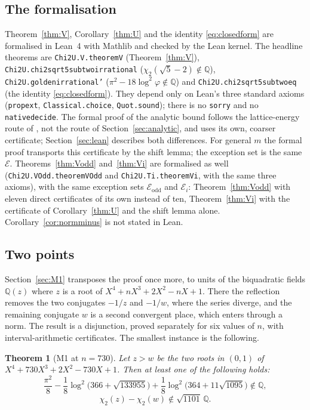 \documentclass[11pt]{amsart}
\newtheorem{theorem}{Theorem}[section]
\theoremstyle{definition}
\theoremstyle{remark}
\numberwithin{equation}{section}
\newcommand{\QQ}{\mathbb{Q}}
\newcommand{\cE}{\mathcal{E}}
\newcommand{\lean}[1]{{\def\_{\textunderscore\allowbreak}\texttt{#1}}}
\begin{document}
\subsection{The formalisation}
Theorem~\ref{thm:V}, Corollary~\ref{thm:U} and the identity \eqref{eq:closedform} are formalised in Lean~4
\cite{LeanFour} with Mathlib \cite{Mathlib} and checked by the Lean kernel. The headline theorems are
\lean{Chi2U.V.theoremV} (Theorem~\ref{thm:V}), \lean{Chi2U.chi2\_sqrt5\_sub\_two\_irrational}
($\chi_2(\sqrt5-2)\notin\QQ$), \lean{Chi2U.golden\_irrational'} ($\pi^2-18\log^2\varphi\notin\QQ$) and
\lean{Chi2U.chi2\_sqrt5\_sub\_two\_eq} (the identity \eqref{eq:closedform}). They depend only on Lean's three standard
axioms (\lean{propext}, \lean{Classical.choice}, \lean{Quot.sound}); there is no \lean{sorry} and no
\lean{native\_decide}. The formal proof of the analytic bound follows the lattice-energy route of \cite{Chi2Paper}, not
the route of Section~\ref{sec:analytic}, and uses its own, coarser certificate; Section~\ref{sec:lean} describes both
differences. For general $m$ the formal proof transports this certificate by the shift lemma; the exception set is
the same $\cE$. Theorems~\ref{thm:Vodd} and~\ref{thm:Vi} are formalised as well (\lean{Chi2U.VOdd.theoremVOdd} and
\lean{Chi2U.Ti.theoremVi}, with the same three axioms), with the same exception sets $\cE_{\mathrm{odd}}$ and $\cE_i$:
Theorem~\ref{thm:Vodd} with eleven direct certificates of its own instead of ten, Theorem~\ref{thm:Vi} with the
certificate of Corollary~\ref{thm:U} and the shift lemma alone. Corollary~\ref{cor:normminus} is not stated in Lean.

\subsection{Two points}
Section~\ref{sec:M1} transposes the proof once more, to units of the biquadratic fields $\QQ(z)$ where $z$ is a root of
$X^4+nX^3+2X^2-nX+1$. There the reflection removes the two conjugates $-1/z$ and $-1/w$, where the series diverge,
and the remaining conjugate $w$ is a second convergent place, which enters through a norm. The result is a disjunction,
proved separately for six values of $n$, with interval-arithmetic certificates. The smallest instance is the following.

\begin{theorem}[M1 at $n=730$]\label{thm:M1-730}
Let $z>w$ be the two roots in $(0,1)$ of $X^4+730X^3+2X^2-730X+1$. Then at least one of the following holds:
\[
  \frac{\pi^2}{8}-\frac18\log^2\bigl(366+\sqrt{133955}\bigr)+\frac18\log^2\bigl(364+11\sqrt{1095}\bigr)\notin\QQ,
\]
\[
  \chi_2(z)-\chi_2(w)\notin\sqrt{1101}\,\QQ .
\]
\end{theorem}
\end{document}
